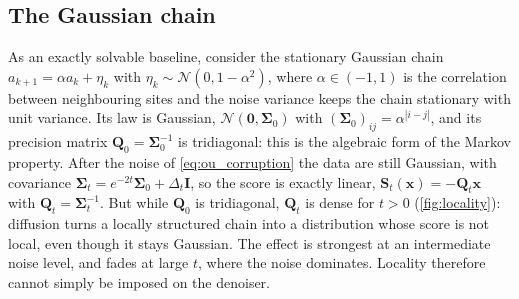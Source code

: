 \documentclass{article}
\begin{document}
\subsection{The Gaussian chain}
\label{sec:gaussian}
As an exactly solvable baseline, consider the stationary Gaussian chain $a_{k+1}=\alpha a_k+\eta_k$ with
$\eta_k\sim\mathcal N(0,1-\alpha^2)$, where $\alpha\in(-1,1)$ is the correlation between neighbouring sites and the noise
variance keeps the chain stationary with unit variance. Its law is Gaussian, $\mathcal N(\mathbf 0,\boldsymbol\Sigma_0)$
with $(\boldsymbol\Sigma_0)_{ij}=\alpha^{|i-j|}$, and its precision matrix $\mathbf Q_0=\boldsymbol\Sigma_0^{-1}$ is
tridiagonal: this is the algebraic form of the Markov property. After the noise of \cref{eq:ou_corruption} the data are
still Gaussian, with covariance $\boldsymbol\Sigma_t=e^{-2t}\boldsymbol\Sigma_0+\Delta_t\mathbf I$, so the score is exactly
linear, $\mathbf S_t(\mathbf x)=-\mathbf Q_t\mathbf x$ with $\mathbf Q_t=\boldsymbol\Sigma_t^{-1}$. But while $\mathbf Q_0$ is
tridiagonal, $\mathbf Q_t$ is dense for $t>0$ (\cref{fig:locality}): diffusion turns a locally structured chain into a
distribution whose score is not local, even though it stays Gaussian. The effect is strongest at an intermediate noise
level, and fades at large $t$, where the noise dominates. Locality therefore
cannot simply be imposed on the denoiser.
\end{document}
